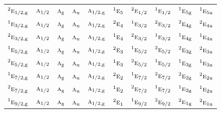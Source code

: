 \documentclass[10pt,a4paper]{article}
\numberwithin{equation}{section}
\newcommand{\irr}[1]{\text{\normalfont\scshape #1}}
\newcommand{\conjpair}[1]{{}^{#1}}
\newcommand{\ptag}[1]{\mathrm{#1}}
\begin{document}
{\begin{longtable}{@{}lccccccccc@{}}
$\conjpair{2}\irr{e}_{1/2,\ptag{g}}$ & $\irr{a}_{1/2}$ & $\irr{a}_{\ptag{g}}$ & $\irr{a}_{\ptag{u}}$ & $\irr{a}_{1/2,\ptag{g}}$ & $\conjpair{1}\irr{e}_{5}$ & $\conjpair{2}\irr{e}_{1/2}$ & $\conjpair{1}\irr{e}_{1/2}$ & $\conjpair{1}\irr{e}_{5\ptag{g}}$ & $\conjpair{1}\irr{e}_{5\ptag{u}}$\\
$\conjpair{1}\irr{e}_{3/2,\ptag{g}}$ & $\irr{a}_{1/2}$ & $\irr{a}_{\ptag{g}}$ & $\irr{a}_{\ptag{u}}$ & $\irr{a}_{1/2,\ptag{g}}$ & $\conjpair{2}\irr{e}_{4}$ & $\conjpair{1}\irr{e}_{3/2}$ & $\conjpair{2}\irr{e}_{3/2}$ & $\conjpair{2}\irr{e}_{4\ptag{g}}$ & $\conjpair{2}\irr{e}_{4\ptag{u}}$\\
$\conjpair{2}\irr{e}_{3/2,\ptag{g}}$ & $\irr{a}_{1/2}$ & $\irr{a}_{\ptag{g}}$ & $\irr{a}_{\ptag{u}}$ & $\irr{a}_{1/2,\ptag{g}}$ & $\conjpair{1}\irr{e}_{4}$ & $\conjpair{2}\irr{e}_{3/2}$ & $\conjpair{1}\irr{e}_{3/2}$ & $\conjpair{1}\irr{e}_{4\ptag{g}}$ & $\conjpair{1}\irr{e}_{4\ptag{u}}$\\
$\conjpair{1}\irr{e}_{5/2,\ptag{g}}$ & $\irr{a}_{1/2}$ & $\irr{a}_{\ptag{g}}$ & $\irr{a}_{\ptag{u}}$ & $\irr{a}_{1/2,\ptag{g}}$ & $\conjpair{2}\irr{e}_{3}$ & $\conjpair{1}\irr{e}_{5/2}$ & $\conjpair{2}\irr{e}_{5/2}$ & $\conjpair{2}\irr{e}_{3\ptag{g}}$ & $\conjpair{2}\irr{e}_{3\ptag{u}}$\\
$\conjpair{2}\irr{e}_{5/2,\ptag{g}}$ & $\irr{a}_{1/2}$ & $\irr{a}_{\ptag{g}}$ & $\irr{a}_{\ptag{u}}$ & $\irr{a}_{1/2,\ptag{g}}$ & $\conjpair{1}\irr{e}_{3}$ & $\conjpair{2}\irr{e}_{5/2}$ & $\conjpair{1}\irr{e}_{5/2}$ & $\conjpair{1}\irr{e}_{3\ptag{g}}$ & $\conjpair{1}\irr{e}_{3\ptag{u}}$\\
$\conjpair{1}\irr{e}_{7/2,\ptag{g}}$ & $\irr{a}_{1/2}$ & $\irr{a}_{\ptag{g}}$ & $\irr{a}_{\ptag{u}}$ & $\irr{a}_{1/2,\ptag{g}}$ & $\conjpair{2}\irr{e}_{2}$ & $\conjpair{1}\irr{e}_{7/2}$ & $\conjpair{2}\irr{e}_{7/2}$ & $\conjpair{2}\irr{e}_{2\ptag{g}}$ & $\conjpair{2}\irr{e}_{2\ptag{u}}$\\
$\conjpair{2}\irr{e}_{7/2,\ptag{g}}$ & $\irr{a}_{1/2}$ & $\irr{a}_{\ptag{g}}$ & $\irr{a}_{\ptag{u}}$ & $\irr{a}_{1/2,\ptag{g}}$ & $\conjpair{1}\irr{e}_{2}$ & $\conjpair{2}\irr{e}_{7/2}$ & $\conjpair{1}\irr{e}_{7/2}$ & $\conjpair{1}\irr{e}_{2\ptag{g}}$ & $\conjpair{1}\irr{e}_{2\ptag{u}}$\\
$\conjpair{1}\irr{e}_{9/2,\ptag{g}}$ & $\irr{a}_{1/2}$ & $\irr{a}_{\ptag{g}}$ & $\irr{a}_{\ptag{u}}$ & $\irr{a}_{1/2,\ptag{g}}$ & $\conjpair{2}\irr{e}_{1}$ & $\conjpair{1}\irr{e}_{9/2}$ & $\conjpair{2}\irr{e}_{9/2}$ & $\conjpair{2}\irr{e}_{1\ptag{g}}$ & $\conjpair{2}\irr{e}_{1\ptag{u}}$\\

\end{longtable}}
\end{document}
